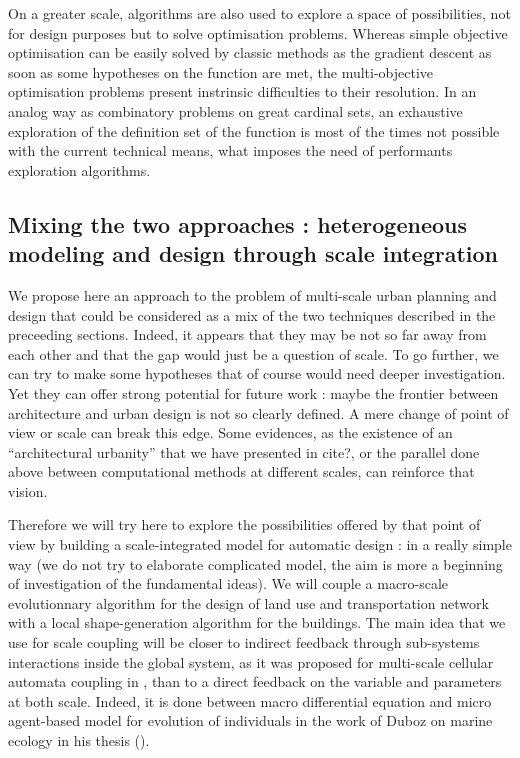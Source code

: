 \documentclass[english]{article}
\begin{document}
On a greater scale, algorithms are also used to explore a space of
possibilities, not for design purposes but to solve optimisation problems.
Whereas simple objective optimisation can be easily solved by classic
methods as the gradient descent as soon as some hypotheses on the
function are met, the multi-objective optimisation problems present
instrinsic difficulties to their resolution. In an analog way as combinatory
problems on great cardinal sets, an exhaustive exploration of the
definition set of the function is most of the times not possible with
the current technical means, what imposes the need of performants
exploration algorithms.


\subsection{Mixing the two approaches : heterogeneous modeling and design through
scale integration}

We propose here an approach to the problem of multi-scale urban planning
and design that could be considered as a mix of the two techniques
described in the preceeding sections. Indeed, it appears that they
may be not so far away from each other and that the gap would just be a question of scale.
To go further, we can try to make some hypotheses that of course would
need deeper investigation. Yet they can offer strong potential for future
work : maybe the frontier between architecture and urban design is not
so clearly defined. A mere change of point of view or scale can break
this edge. Some evidences, as the existence of an ``architectural
urbanity'' that we have presented in cite?, or the parallel done above
between computational methods at different scales, can reinforce that vision.

\bigskip{}


Therefore we will try here to explore the possibilities offered by
that point of view by building a scale-integrated model for automatic
design : in a really simple way (we do not try to elaborate complicated
model, the aim is more a beginning of investigation of the fundamental
ideas). We will couple a macro-scale evolutionnary algorithm for the
design of land use and transportation network with a local shape-generation
algorithm for the buildings. The main idea that we use for scale coupling
will be closer to indirect feedback through sub-systems interactions inside
the global system, as it was proposed for multi-scale cellular automata
coupling in \cite{MultiScaleCA10}, than to a direct feedback on the variable
and parameters at both scale. Indeed, it is done between macro differential
equation and micro agent-based model for evolution of individuals
in the work of Duboz on marine ecology in his thesis (\cite{Duboz:phd}).
\end{document}
